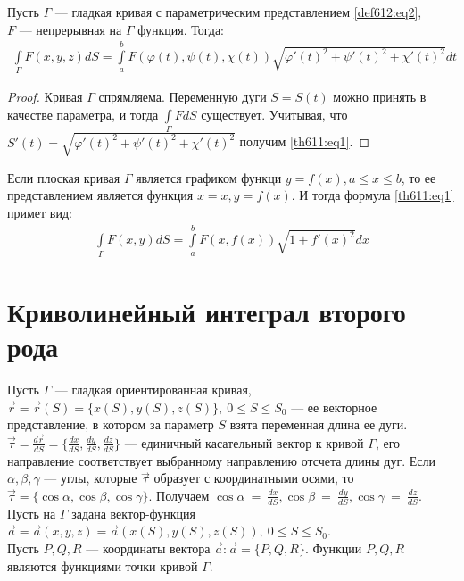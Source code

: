 \begin{theorem}
  Пусть $\Gamma$ --- гладкая кривая с параметрическим представлением
  \eqref{def612:eq2},\\ $F$ --- непрерывная на $\Gamma$ функция. Тогда:
  \begin{gather}
    \int\limits_\Gamma F(x, y, z) dS = \int\limits_a^b F(\varphi(t), \psi(t),
    \chi(t)) \sqrt{\varphi'(t)^2 + \psi'(t)^2 + \chi'(t)^2} dt
    \label{th611:eq1}
  \end{gather}
\end{theorem}

\begin{proof}
  Кривая $\Gamma$ спрямляема. Переменную дуги $S = S(t)$ можно принять в
  качестве параметра, и тогда $\int\limits_\Gamma FdS$ существует. Учитывая,
  что $S'(t) = \sqrt{\varphi'(t)^2 + \psi'(t)^2 + \chi'(t)^2}$ получим
  \eqref{th611:eq1}.
\end{proof}

\begin{remark}
  Если плоская кривая $\Gamma$ является графиком функци $y = f(x), a \leq x
  \leq b$, то ее представлением является функция $x = x, y = f(x)$. И тогда
  формула \eqref{th611:eq1} примет вид:
  \begin{gather*}
    \int\limits_\Gamma F(x, y) dS = \int\limits_a^b F(x, f(x)) \sqrt{1 +
    f'(x)^2} dx
  \end{gather*}
\end{remark}

\section{Криволинейный интеграл второго рода}

Пусть $\Gamma$ --- гладкая ориентированная кривая,\\ $\vec{r} = \vec{r}(S) =
\{x(S), y(S), z(S)\}, \ 0 \leq S \leq S_0$ --- ее векторное представление, в
котором за параметр $S$ взята переменная длина ее дуги. $\vec{\tau} =
\frac{d \vec{r}}{dS} = \{\frac{dx}{dS}, \frac{dy}{dS}, \frac{dz}{dS}\}$ ---
единичный касательный вектор к кривой $\Gamma$, его направление соответствует
выбранному направлению отсчета длины дуг. Если $\alpha, \beta, \gamma$ ---
углы, которые $\vec\tau$ образует с координатными осями, то $\vec\tau = \{\cos
\alpha, \cos \beta, \cos \gamma\}$. Получаем $\cos \alpha~=~\frac{dx}{dS}, \cos
\beta~=~\frac{dy}{dS}, \cos \gamma~=~\frac{dz}{dS}$. \\

Пусть на $\Gamma$ задана вектор-функция $\vec a = \vec a(x, y, z) = \vec
a(x(S), y(S), z(S)), \ 0 \leq S \leq S_0$. \\ Пусть $P, Q, R$ --- координаты
вектора $\vec a : \vec a = \{P, Q, R\}$. Функции $P, Q, R$ являются функциями
точки кривой $\Gamma$.

